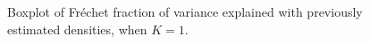 \begin{figure}[h]
    \centering
    \resizebox{0.9\textwidth}{!}{}
    \caption[Simulation results: boxplots fve --- estimated densities]{Boxplot of
    Fréchet fraction of variance explained with previously estimated densities, when
    $K = 1$.}
    \label{fig:sim_fve_denstimation}
\end{figure}




















